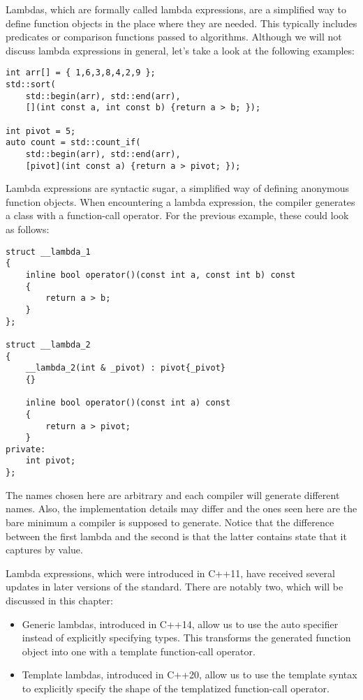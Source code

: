 Lambdas, which are formally called lambda expressions, are a simplified way to define function objects in the place where they are needed. This typically includes predicates or comparison functions passed to algorithms. Although we will not discuss lambda expressions in general, let's take a look at the following examples:

\begin{lstlisting}[style=styleCXX]
int arr[] = { 1,6,3,8,4,2,9 };
std::sort(
	std::begin(arr), std::end(arr),
	[](int const a, int const b) {return a > b; });
	
int pivot = 5;
auto count = std::count_if(
	std::begin(arr), std::end(arr),
	[pivot](int const a) {return a > pivot; });
\end{lstlisting}

Lambda expressions are syntactic sugar, a simplified way of defining anonymous function objects. When encountering a lambda expression, the compiler generates a class with a function-call operator. For the previous example, these could look as follows:

\begin{lstlisting}[style=styleCXX]
struct __lambda_1
{
	inline bool operator()(const int a, const int b) const
	{
		return a > b;
	}
};

struct __lambda_2
{
	__lambda_2(int & _pivot) : pivot{_pivot}
	{}
	
	inline bool operator()(const int a) const
	{
		return a > pivot;
	}
private:
	int pivot;
};
\end{lstlisting}

The names chosen here are arbitrary and each compiler will generate different names. Also, the implementation details may differ and the ones seen here are the bare minimum a compiler is supposed to generate. Notice that the difference between the first lambda and the second is that the latter contains state that it captures by value.

Lambda expressions, which were introduced in C++11, have received several updates in later versions of the standard. There are notably two, which will be discussed in this chapter:

\begin{itemize}
\item 
Generic lambdas, introduced in C++14, allow us to use the auto specifier instead of explicitly specifying types. This transforms the generated function object into one with a template function-call operator.

\item 
Template lambdas, introduced in C++20, allow us to use the template syntax to explicitly specify the shape of the templatized function-call operator.
\end{itemize}

